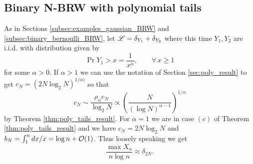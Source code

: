 \subsection{Binary N-BRW with polynomial tails}
As in Sections \ref{subsec:examples_gaussian_BRW} and \ref{subsec:binary_bernoulli_BRW}, let $\scr{L} = \delta_{Y_1} + \delta_{Y_2}$ where this time $Y_1, Y_2$ are i.i.d. with distribution given by
\begin{equation}
\Pr{Y_1 > x} = \frac{1}{x^\alpha},\qquad\forall\,x \geq 1
\end{equation}
for some $\alpha > 0$. If $\alpha > 1$ we can use the notation of Section \ref{sec:poly_result} to get $c_N = (2N \log_2 N)^{1/\alpha)}$ so that
\begin{equation}\nonumber
v_N \sim \frac{\rho_\alpha c_N}{\log_2 N} \propto \left( \frac{N}{(\log N)^{\alpha - 1 }} \right)^{1/\alpha}
\end{equation}
by Theorem \ref{thm:poly_tails_result}. For $\alpha = 1$ we are in case $(c)$ of Theorem \ref{thm:poly_tails_result} and we have $c_N = 2 N \log_2 N$ and $b_N = \int^n_1 dx/x = \log n + \cal{O}(1)$. Thus loosely speaking we get 
\begin{equation}
\frac{\max X_n}{n \log n} \approx \delta_{2N}. 
\end{equation}

\newpage
